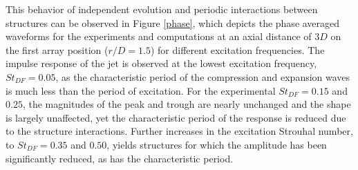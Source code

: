 \documentclass[english]{aiaa-tc}
\begin{document}
This behavior of independent evolution and periodic interactions
between structures can be observed in Figure \ref{phase}, which
depicts the phase averaged waveforms for the experiments and
computations at an axial distance of $3D$ on the first array position
($r/D=1.5$) for different excitation frequencies. The impulse response
of the jet is observed at the lowest excitation frequency, $St_{DF} =
0.05$, as the characteristic period of the compression and expansion
waves is much less than the period of excitation. For the experimental
$St_{DF} = 0.15$ and $0.25$, the magnitudes of the peak and trough are
nearly unchanged and the shape is largely unaffected, yet the
characteristic period of the response is reduced due to the structure
interactions. Further increases in the excitation Strouhal number, to
$St_{DF} = 0.35$ and $0.50$, yields structures for which the amplitude
has been significantly reduced, as has the characteristic period. 
\end{document}
